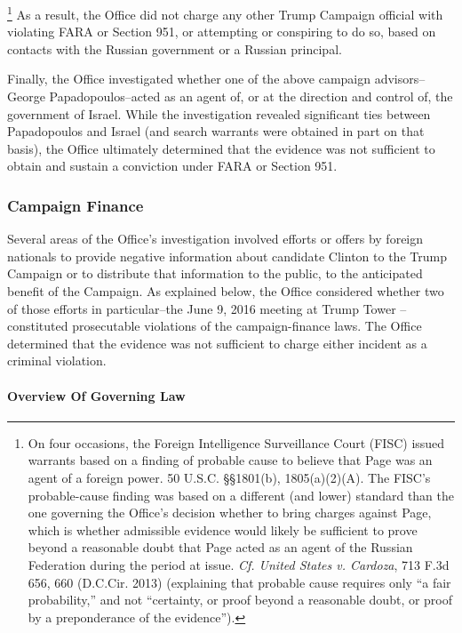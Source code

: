 \footnote{On four occasions, the Foreign Intelligence Surveillance Court (FISC) issued warrants based on a finding of probable cause to believe that Page was an agent of a foreign power.
50 U.S.C. \S\S 1801(b), 1805(a)(2)(A).
The FISC’s probable-cause finding was based on a different (and lower) standard than the one governing the Office’s decision whether to bring charges against Page, which is whether admissible evidence would likely be sufficient to prove beyond a reasonable doubt that Page acted as an agent of the Russian Federation during the period at issue.
\textit{Cf. United States v. Cardoza}, 713 F.3d 656, 660 (D.C.Cir. 2013) (explaining that probable cause requires only “a fair probability,” and not “certainty, or proof beyond a reasonable doubt, or proof by a preponderance of the evidence”).}
As a result, the Office did not charge  any other Trump Campaign official with violating FARA or Section 951, or attempting or conspiring to do so, based on contacts with the Russian government or a Russian principal.

Finally, the Office investigated whether one of the above campaign advisors--George Papadopoulos--acted as an agent of, or at the direction and control of, the government of Israel.
While the investigation revealed significant ties between Papadopoulos and Israel (and search warrants were obtained in part on that basis), the Office ultimately determined that the evidence was not sufficient to obtain and sustain a conviction under FARA or Section 951.

\subsubsection{Campaign Finance}
Several areas of the Office's investigation involved efforts or offers by foreign nationals to provide negative information about candidate Clinton to the Trump Campaign or to distribute that information to the public, to the anticipated benefit of the Campaign.
As explained below, the Office considered whether two of those efforts in particular--the June 9, 2016 meeting at Trump Tower --constituted prosecutable violations of the campaign-finance laws.
The Office determined that the evidence was not sufficient to charge either incident as a criminal violation.

\paragraph{Overview Of Governing Law}

